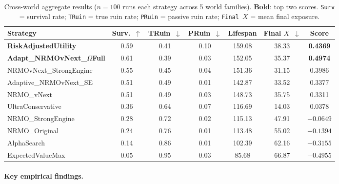 \begin{table}[ht]
\centering
\scriptsize
\renewcommand{\arraystretch}{1.05}
\begin{tabularx}{\linewidth}{Xcccccc}
\toprule
\textbf{Strategy} & \textbf{Surv.~$\uparrow$} &
\textbf{TRuin~$\downarrow$} & \textbf{PRuin~$\downarrow$} &
\textbf{Lifespan} & \textbf{Final $X$~$\downarrow$} &
\textbf{Score} \\
\midrule
\textbf{RiskAdjustedUtility}     & 0.59 & 0.41 & 0.10 & 159.08
& 38.33 & \textbf{0.4369} \\
\textbf{Adapt\_NRMOvNext\_$\Omega$Full}
                                  & 0.61 & 0.39 & 0.03 & 152.05
& 35.37 & \textbf{0.4974} \\
NRMOvNext\_StrongEngine          & 0.55 & 0.45 & 0.04 & 151.36
& 31.15 & 0.3986 \\
Adaptive\_NRMOvNext\_SE          & 0.51 & 0.49 & 0.01 & 142.87
& 33.52 & 0.3377 \\
NRMO\_vNext                      & 0.51 & 0.49 & 0.03 & 148.73
& 35.75 & 0.3311 \\
UltraConservative                & 0.36 & 0.64 & 0.07 & 116.69
& 14.03 & 0.0378 \\
NRMO\_StrongEngine               & 0.28 & 0.72 & 0.02 & 115.13
& 47.91 & $-0.0649$ \\
NRMO\_Original                   & 0.24 & 0.76 & 0.01 & 113.48
& 55.02 & $-0.1394$ \\
AlphaSearch                      & 0.14 & 0.86 & 0.01 & 102.39
& 62.16 & $-0.3155$ \\
ExpectedValueMax                 & 0.05 & 0.95 & 0.03 &  85.68
& 66.87 & $-0.4955$ \\
\bottomrule
\end{tabularx}
\caption[Empirical overall results]{Cross-world aggregate
results ($n = 100$ runs each strategy across 5 world families).
\textbf{Bold}: top two scores. \texttt{Surv} = survival rate;
\texttt{TRuin} = true ruin rate; \texttt{PRuin} = passive ruin rate;
\texttt{Final $X$} = mean final exposure.}
\label{tab:empirical-overall}
\end{table}

\paragraph{Key empirical findings.}


